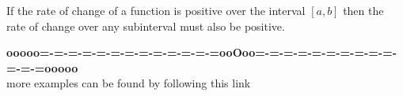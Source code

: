 \documentclass{ximera}
\begin{document}
\begin{question}
If the rate of change of a function is positive over the interval $[a,b]$ then the rate of change over any subinterval must also be positive.
    \begin{multipleChoice}
    \end{multipleChoice}
\end{question}











\begin{center}
\textbf{\textcolor{green!50!black}{ooooo=-=-=-=-=-=-=-=-=-=-=-=-=ooOoo=-=-=-=-=-=-=-=-=-=-=-=-=ooooo}} \\

more examples can be found by following this link\\ 

\end{center}
\end{document}
